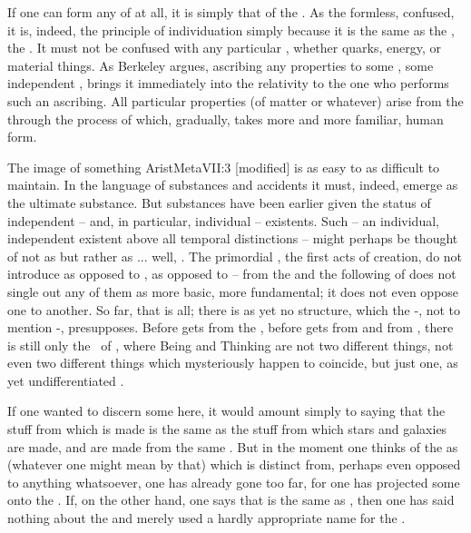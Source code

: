 If one can form any  of  at all, it is simply
that of the .  As the formless, confused,  it is,
indeed, the principle of individuation simply because it is the same as the
, the .  It must not be confused with any particular
, whether quarks, energy, or  material things.  As
Berkeley argues, ascribing any properties to some  ,
some independent , brings it immediately into the relativity to the
one who performs such an ascribing.  All particular properties (of matter or
whatever) arise from the  through the  process of
 which, gradually, takes more and more familiar, human form.

The image of something \citet{which remains when all else is stripped
  off}{AristMeta}{VII:3 [modified]} is as easy to  as difficult to
maintain. In the language of substances and accidents it must, indeed, emerge as
  the ultimate substance. But substances have been earlier given the
  status of independent -- and, in particular, individual -- existents. Such
   -- an individual, independent existent above all temporal
  distinctions -- might perhaps be thought of not as  but rather as
  ... well, . 
The primordial , the
first acts of creation, do not introduce  as opposed to
,  as opposed to  --  from the  and the following  of
 does not single out any of them as more basic, more
fundamental; it does not even oppose one to another.  So far, that is
all; there is as yet no structure, which the 
-, not to mention -,
presupposes.  Before  gets  from the
, before  gets  from
 and  from  , there is still only
the \nexus\ of , where Being and Thinking are not two
different things, not even two different things which mysteriously happen to 
coincide, but just one, as yet undifferentiated \nexus. 

If one wanted to discern some  here, it would amount simply to
saying that the 
stuff from which  is made is the same as the stuff from
which stars and galaxies are made,  and  are made
from the same .  But in the moment one thinks of the 
as  (whatever one might mean by that) which is distinct
from, perhaps even opposed to anything whatsoever, one has already
gone too far, for one has projected some  onto the
.  If, on the other hand, one says that  is
the same as , then one has said nothing about the  and
merely used a hardly appropriate name for the .


